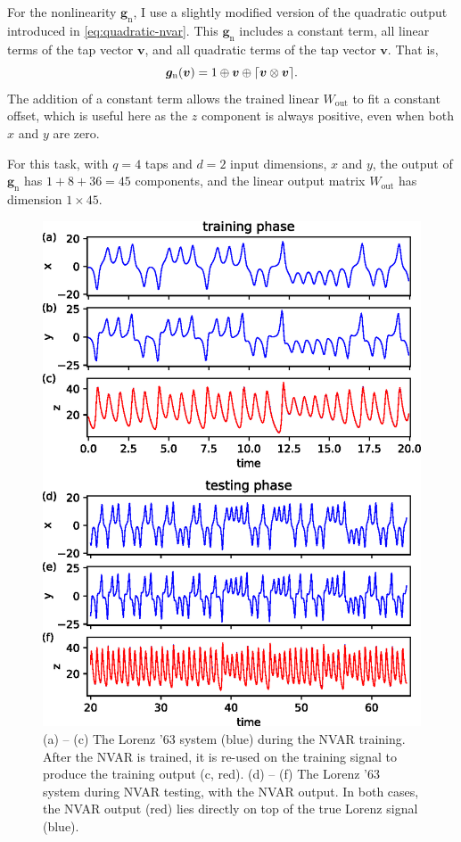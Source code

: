 For the nonlinearity $\bm{g}_\text{n}$, I use a slightly modified
version of the quadratic output introduced in
\cref{eq:quadratic-nvar}. This $\bm{g}_\text{n}$ includes a constant
term, all linear terms of the tap vector $\bm{v}$, and all quadratic
terms of the tap vector $\bm{v}$. That is,
\begin{equation}
  \label{eq:quadratic-nvar-const}
  \bm{g}_\text{n}(\bm{v}) = 1 \oplus \bm{v} \oplus \lceil\bm{v} \otimes \bm{v}\rceil.
\end{equation}
The addition of a constant term allows the trained linear
$W_\text{out}$ to fit a constant offset, which is useful here as the
$z$ component is always positive, even when both $x$ and $y$ are zero.

For this task, with $q = 4$ taps and $d = 2$ input dimensions, $x$ and $y$, the
output of $\bm{g}_\text{n}$ has $1 + 8 + 36 = 45$ components, and the linear
output matrix $W_\text{out}$ has dimension $1 \times 45$.

\begin{figure}
  \includegraphics{figures/nvar-infer-lorenz}
  \caption{(a) -- (c) The Lorenz '63 system (blue) during the NVAR
    training. After the NVAR is trained, it is re-used on the
    training signal to produce the training output (c, red). (d) --
    (f) The Lorenz '63 system during NVAR testing, with the NVAR
    output. In both cases, the NVAR output (red) lies directly on top
    of the true Lorenz signal (blue).}
  \label{fig:nvar-infer-lorenz}
\end{figure}

